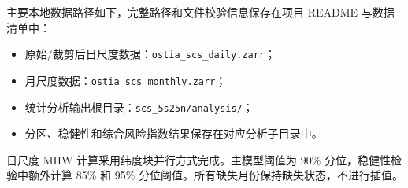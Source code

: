 \documentclass[UTF8,a4paper,zihao=-4,fontset=fandol]{ctexart}
\begin{document}
主要本地数据路径如下，完整路径和文件校验信息保存在项目 README 与数据清单中：
\begin{itemize}
  \item 原始/裁剪后日尺度数据：\texttt{ostia\_scs\_daily.zarr}；
  \item 月尺度数据：\texttt{ostia\_scs\_monthly.zarr}；
  \item 统计分析输出根目录：\texttt{scs\_5s25n/analysis/}；
  \item 分区、稳健性和综合风险指数结果保存在对应分析子目录中。
\end{itemize}

日尺度 MHW 计算采用纬度块并行方式完成。主模型阈值为 90\% 分位，稳健性检验中额外计算 85\% 和 95\% 分位阈值。所有缺失月份保持缺失状态，不进行插值。
\end{document}
